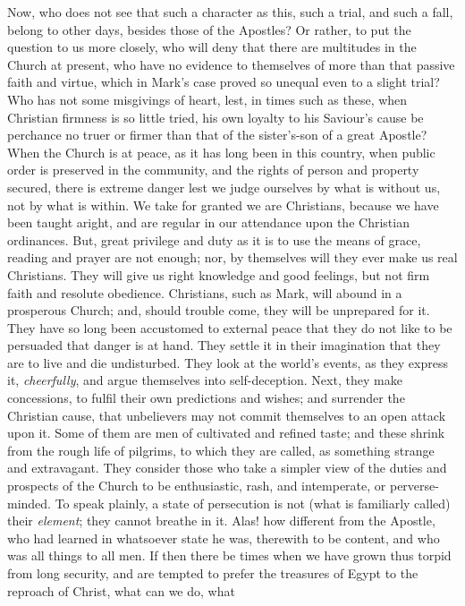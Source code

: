Now, who does not see that such a character as this, such a trial,
and such a fall, belong to other days, besides those of the Apostles? Or
rather, to put the question to us more closely, who will deny that there
are multitudes in the Church at present, who have no evidence to
themselves of more than that passive faith and virtue, which in Mark's
case proved so unequal even to a slight trial? Who has not some
misgivings of heart, lest, in times such as these, when Christian
firmness is so little tried, his own loyalty to his Saviour's cause be
perchance no truer or firmer than that of the sister's-son of a great
Apostle? When the Church is at peace, as it has long been in this
country, when public order is preserved in the community, and the rights
of person and property secured, there is extreme danger lest we judge
ourselves by what is without us, not by what is within. We take for
granted we are Christians, because we have been taught aright, and are
regular in our attendance upon the Christian ordinances. But, great
privilege and duty as it is to use the means of grace, reading and
prayer are not enough; nor, by themselves will they ever make us real
Christians. They will give us right knowledge and good feelings, but not
firm faith and resolute obedience. Christians, such as Mark, will abound
in a prosperous Church; and, should trouble come, they will be
unprepared for it. They have so long been accustomed to external peace
that they do not like to be persuaded that danger is at hand. They
settle it in their imagination that they are to live and die
undisturbed. They look at the world's events, as they express it, \emph{cheerfully},
and argue themselves into self-deception. Next, they make concessions,
to fulfil their own predictions and wishes; and surrender the Christian
cause, that unbelievers may not commit themselves to an open attack upon
it. Some of them are men of cultivated and refined taste; and these
shrink from the rough life of pilgrims, to which they are called, as
something strange and extravagant. They consider those who take a
simpler view of the duties and prospects of the Church to be
enthusiastic, rash, and intemperate, or perverse-minded. To speak
plainly, a state of persecution is not (what is familiarly called) their
\emph{element}; they cannot breathe in it. Alas! how different from the
Apostle, who had learned in whatsoever state he was, therewith to be
content, and who was all things to all men. If then there be times when
we have grown thus torpid from long security, and are tempted to prefer
the treasures of Egypt to the reproach of Christ, what can we do, what
